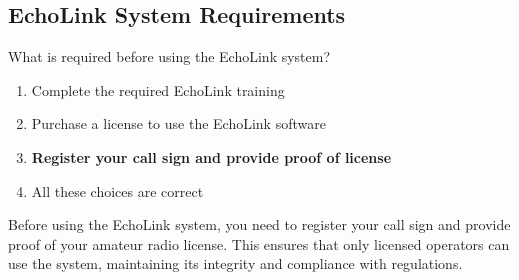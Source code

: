 \subsection{EchoLink System Requirements}
\label{T8C10}

\begin{tcolorbox}[colback=gray!10!white,colframe=black!75!black,title=T8C10]
What is required before using the EchoLink system?
\begin{enumerate}[noitemsep]
    \item Complete the required EchoLink training
    \item Purchase a license to use the EchoLink software
    \item \textbf{Register your call sign and provide proof of license}
    \item All these choices are correct
\end{enumerate}
\end{tcolorbox}

Before using the EchoLink system, you need to register your call sign and provide proof of your amateur radio license. This ensures that only licensed operators can use the system, maintaining its integrity and compliance with regulations.
